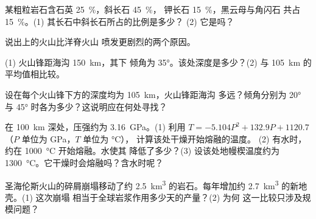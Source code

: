 \begin{exercise}[$\star$]\label{exo:g12:subduction-magmatism:4}
某粗粒岩石含石英 \qty{25}{\percent}，斜长石 \qty{45}{\percent}，
钾长石 \qty{15}{\percent}，黑云母与角闪石
共占 \qty{15}{\percent}。(1) 其长石中斜长石所占的比例是多少？
(2) 它是吗？
\end{exercise}

\begin{exercise}[$\star$]\label{exo:g12:subduction-magmatism:5}
说出上的火山比洋脊火山
喷发更剧烈的两个原因。
\end{exercise}

\begin{exercise}[$\star\star$]\label{exo:g12:subduction-magmatism:6}
(1) 火山锋距海沟 \qty{150}{km}，其下
倾角为 \ang{35}。该处深度是多少？(2) 与
\qty{105}{km} 的平均值相比较。
\end{exercise}

\begin{exercise}[$\star\star$]\label{exo:g12:subduction-magmatism:7}
设在每个火山锋下方的深度均为 \qty{105}{km}，火山锋距海沟
多远？倾角分别为 \ang{20} 与
\ang{45} 时各为多少？这说明应在何处寻找？
\end{exercise}

\begin{exercise}[$\star\star$]\label{exo:g12:subduction-magmatism:8}
在 \qty{100}{km} 深处，压强约为 \qty{3.16}{GPa}。(1) 利用 $T =
-5.104P^2 + 132.9P + 1120.7$（$P$ 单位为 \unit{GPa}，$T$ 单位为 \unit{\celsius}），
计算该处干燥开始熔融的温度。
(2) 有水时，约在 \qty{1000}{\celsius} 开始熔融。水使其
降低了多少？(3) 设该处地幔楔温度约为
\qty{1300}{\celsius}。它干燥时会熔融吗？含水时呢？
\end{exercise}

\begin{exercise}[$\star\star$]\label{exo:g12:subduction-magmatism:9}
圣海伦斯火山的碎屑崩塌移动了约 \qty{2.5}{km^3}
的岩石。每年增加约 \qty{2.7}{km^3} 的新地壳。(1) 这次崩塌
相当于全球岩浆作用多少天的产量？(2) 为何
这一比较只涉及规模问题？
\end{exercise}

